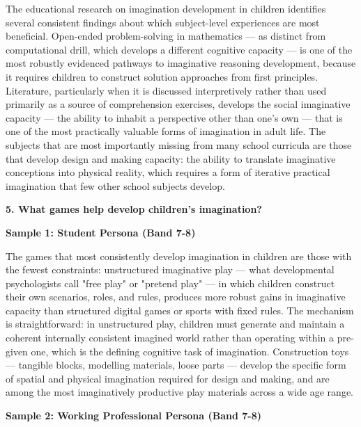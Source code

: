 The educational research on imagination development in children identifies several consistent findings about which subject-level experiences are most beneficial. Open-ended problem-solving in mathematics — as distinct from computational drill, which develops a different cognitive capacity — is one of the most robustly evidenced pathways to imaginative reasoning development, because it requires children to construct solution approaches from first principles. Literature, particularly when it is discussed interpretively rather than used primarily as a source of comprehension exercises, develops the social imaginative capacity — the ability to inhabit a perspective other than one's own — that is one of the most practically valuable forms of imagination in adult life. The subjects that are most importantly missing from many school curricula are those that develop design and making capacity: the ability to translate imaginative conceptions into physical reality, which requires a form of iterative practical imagination that few other school subjects develop.

\separator

\begin{ieltsquestion}
\textbf{5. What games help develop children's imagination?}
\end{ieltsquestion}
\textbf{Sample 1: Student Persona (Band 7-8)}

The games that most consistently develop imagination in children are those with the fewest constraints: unstructured imaginative play — what developmental psychologists call "free play" or "pretend play" — in which children construct their own scenarios, roles, and rules, produces more robust gains in imaginative capacity than structured digital games or sports with fixed rules. The mechanism is straightforward: in unstructured play, children must generate and maintain a coherent internally consistent imagined world rather than operating within a pre-given one, which is the defining cognitive task of imagination. Construction toys — tangible blocks, modelling materials, loose parts — develop the specific form of spatial and physical imagination required for design and making, and are among the most imaginatively productive play materials across a wide age range.

\textbf{Sample 2: Working Professional Persona (Band 7-8)}

